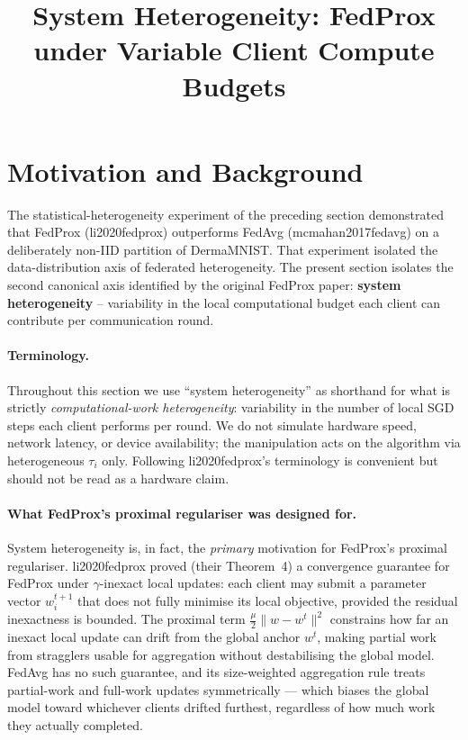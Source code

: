 \documentclass[11pt,a4paper]{article}
\title{System Heterogeneity: FedProx under Variable Client Compute Budgets}
\author{}
\date{}
\providecommand{\citep}[1]{(#1)}
\providecommand{\citet}[1]{#1}
\begin{document}
\maketitle

\section{Motivation and Background}

The statistical-heterogeneity experiment of the preceding section
demonstrated that FedProx \citep{li2020fedprox} outperforms FedAvg
\citep{mcmahan2017fedavg} on a deliberately non-IID partition of
DermaMNIST. That experiment isolated the data-distribution axis of
federated heterogeneity. The present section isolates the second canonical
axis identified by the original FedProx paper: \textbf{system
heterogeneity} -- variability in the local computational budget each
client can contribute per communication round.

\paragraph{Terminology.} Throughout this section we use ``system
heterogeneity'' as shorthand for what is strictly
\emph{computational-work heterogeneity}: variability in the number of
local SGD steps each client performs per round. We do not simulate
hardware speed, network latency, or device availability; the
manipulation acts on the algorithm via heterogeneous $\tau_i$ only.
Following \citet{li2020fedprox}'s terminology is convenient but
should not be read as a hardware claim.

\paragraph{What FedProx's proximal regulariser was designed for.}
System heterogeneity is, in fact, the \emph{primary} motivation for
FedProx's proximal regulariser. \citet{li2020fedprox} proved (their
Theorem~4) a convergence guarantee for FedProx under $\gamma$-inexact
local updates: each client may submit a parameter vector $w_i^{t+1}$ that
does not fully minimise its local objective, provided the residual
inexactness is bounded. The proximal term $\frac{\mu}{2}\lVert w - w^t \rVert^2$
constrains how far an inexact local update can drift from the global
anchor $w^t$, making partial work from stragglers usable for aggregation
without destabilising the global model. FedAvg has no such guarantee, and
its size-weighted aggregation rule treats partial-work and full-work
updates symmetrically --- which biases the global model toward whichever
clients drifted furthest, regardless of how much work they actually
completed.
\end{document}
